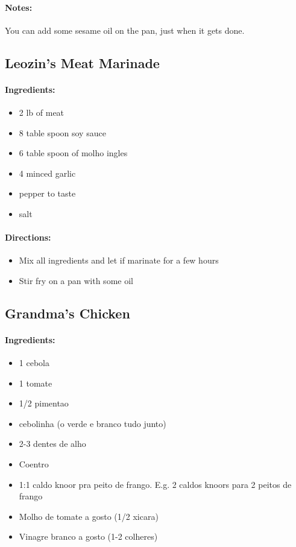 \documentclass{article}
\begin{document}
\paragraph{Notes:}You can add some sesame oil on the pan, just when it gets done.

\subsection{Leozin’s Meat Marinade}

\paragraph{Ingredients:}

\begin{itemize}
   \item 2 lb of meat
	\item 8 table spoon soy sauce
	\item 6 table spoon of molho ingles
	\item 4 minced garlic
	\item pepper to taste
	\item salt 
\end{itemize}

\paragraph{Directions:}
\begin{itemize}
	\item Mix all ingredients and let if marinate for a few hours
	\item Stir fry on a pan with some oil
\end{itemize}

\subsection{Grandma’s Chicken}

\paragraph{Ingredients:}

\begin{itemize}
	\item 1 cebola 
	\item 1 tomate 
	\item 1/2 pimentao 
	\item cebolinha (o verde e branco tudo junto) 
	\item 2-3 dentes de alho 
	\item Coentro 
	\item 1:1 caldo knoor pra peito de frango. E.g. 2 caldos knoors para 2 peitos de frango
	\item Molho de tomate a gosto (1/2 xicara)
	\item Vinagre branco a gosto (1-2 colheres)
\end{itemize}
\end{document}
